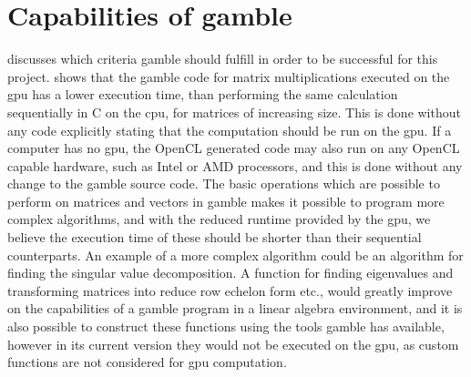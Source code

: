 \section{Capabilities of \gls{gamble}}
 discusses which criteria \gls{gamble} should fulfill in order to be successful for this project.
 shows that the \gls{gamble} code for matrix multiplications executed on the \acrshort{gpu} has a lower execution time, than performing the same calculation sequentially in C on the \acrshort{cpu}, for matrices of increasing size.
This is done without any code explicitly stating that the computation should be run on the \acrshort{gpu}.
If a computer has no \acrshort{gpu}, the OpenCL generated code may also run on any OpenCL capable hardware, such as Intel or AMD processors, and this is done without any change to the \gls{gamble} source code.
The basic operations which are possible to perform on matrices and vectors in \gls{gamble} makes it possible to program more complex algorithms, and with the reduced runtime provided by the \acrshort{gpu}, we believe the execution time of these should be shorter than their sequential counterparts.
An example of a more complex algorithm could be an algorithm for finding the singular value decomposition.
A function for finding eigenvalues and transforming matrices into reduce row echelon form etc., would greatly improve on the capabilities of a \gls{gamble} program in a linear algebra environment, and it is also possible to construct these functions using the tools \gls{gamble} has available, however in its current version they would not be executed on the \acrshort{gpu}, as custom functions are not considered for  \acrshort{gpu} computation.